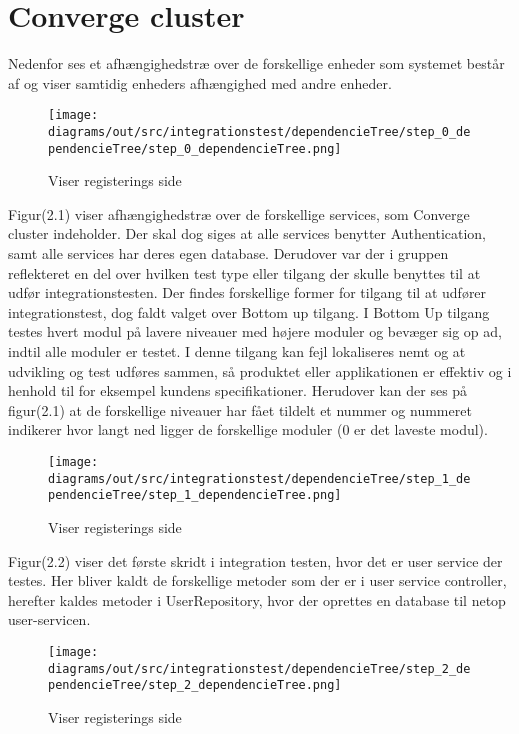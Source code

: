 \chapter{Converge cluster}

Nedenfor ses et afhængighedstræ over de forskellige enheder som systemet består af og viser samtidig enheders afhængighed med andre enheder.

\begin{figure}[ht]
    \centering
\texttt{[image: diagrams/out/src/integrationstest/dependencieTree/step\_0\_dependencieTree/step\_0\_dependencieTree.png]}
\caption{Viser registerings side}
\label{fig:figure2}
\end{figure}


Figur(2.1) viser afhængighedstræ over de forskellige services, som Converge cluster indeholder. Der skal dog siges at alle services benytter Authentication, samt alle services har deres egen database.
Derudover var der i gruppen reflekteret en del over hvilken test type eller tilgang der skulle benyttes til at udfør integrationstesten. Der findes forskellige former for tilgang til at udfører integrationstest, dog faldt valget over Bottom up tilgang. I Bottom Up tilgang testes hvert modul på lavere niveauer med højere moduler og bevæger sig op ad, indtil alle moduler er testet. I denne tilgang kan fejl lokaliseres nemt og at udvikling og test udføres sammen, så produktet eller applikationen er effektiv og i henhold til for eksempel kundens specifikationer. 
Herudover kan der ses på figur(2.1) at de forskellige niveauer har fået tildelt et nummer og nummeret indikerer hvor langt ned ligger de forskellige moduler (0 er det laveste modul). 

\newpage


\begin{figure}[ht]
    \centering
\texttt{[image: diagrams/out/src/integrationstest/dependencieTree/step\_1\_dependencieTree/step\_1\_dependencieTree.png]}
\caption{Viser registerings side}
\label{fig:figure2}
\end{figure}

Figur(2.2) viser det første skridt i integration testen, hvor det er user service der testes. Her bliver kaldt de forskellige metoder som der er i user service controller, herefter kaldes metoder i UserRepository, hvor der oprettes en database til netop user-servicen. 


\begin{figure}[ht]
    \centering
\texttt{[image: diagrams/out/src/integrationstest/dependencieTree/step\_2\_dependencieTree/step\_2\_dependencieTree.png]}
\caption{Viser registerings side}
\label{fig:figure2}
\end{figure}

